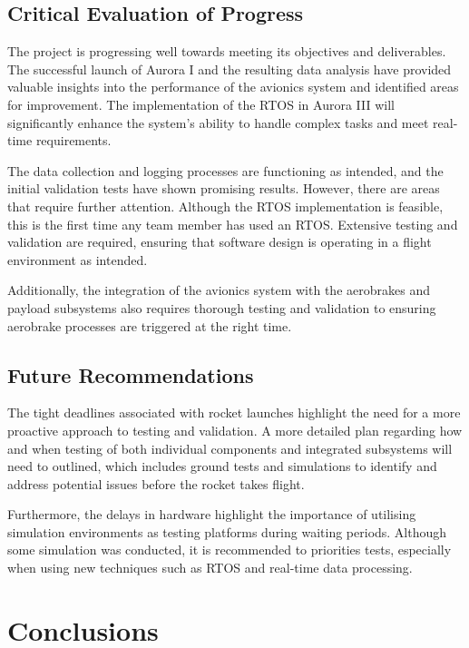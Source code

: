 \subsection{Critical Evaluation of Progress}
The project is progressing well towards meeting its objectives and deliverables. The successful launch of Aurora I and the resulting data analysis have provided valuable insights into the performance of the avionics system and identified areas for improvement. The implementation of the RTOS in Aurora III will significantly enhance the system's ability to handle complex tasks and meet real-time requirements. 

The data collection and logging processes are functioning as intended, and the initial validation tests have shown promising results. However, there are areas that require further attention. Although the RTOS implementation is feasible, this is the first time any team member has used an RTOS. Extensive testing and validation are required, ensuring that software design is operating in a flight environment as intended. 

Additionally, the integration of the avionics system with the aerobrakes and payload subsystems also requires thorough testing and validation to ensuring aerobrake processes are triggered at the right time.  

\subsection{Future Recommendations}
The tight deadlines associated with rocket launches highlight the need for a more proactive approach to testing and validation. A more detailed plan regarding how and when testing of both individual components and integrated subsystems will need to outlined, which includes ground tests and simulations to identify and address potential issues before the rocket takes flight. 

Furthermore, the delays in hardware highlight the importance of utilising simulation environments as testing platforms during waiting periods. Although some simulation was conducted, it is recommended to priorities tests, especially when using new techniques such as RTOS and real-time data processing.  

\section{Conclusions}
